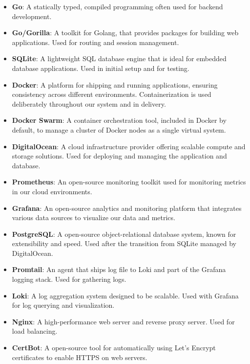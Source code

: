 \begin{multicols}{2}
    \begin{itemize}
        \item \textbf{Go}: A statically typed, compiled programming often used for backend development.
        \item \textbf{Go/Gorilla}: A toolkit for Golang, that provides packages for building web applications. Used for routing and session management.
        \item \textbf{SQLite}: A lightweight SQL database engine that is ideal for embedded database applications. Used in initial setup and for testing.
        \item \textbf{Docker}: A platform for shipping and running applications, ensuring consistency across different environments. Containerization is used deliberately throughout our system and in delivery.
        \item \textbf{Docker Swarm}: A container orchestration tool, included in Docker by default, to manage a cluster of Docker nodes as a single virtual system.
        \item \textbf{DigitalOcean}: A cloud infrastructure provider offering scalable compute and storage solutions. Used for deploying and managing the application and database.
        \item \textbf{Prometheus}: An open-source monitoring toolkit used for monitoring metrics in our cloud environments.
        \item \textbf{Grafana}: An open-source analytics and monitoring platform that integrates various data sources to visualize our data and metrics.
        \item \textbf{PostgreSQL}: A open-source object-relational database system, known for extensibility and speed. Used after the transition from SQLite managed by DigitalOcean.
        \item \textbf{Promtail}: An agent that ships log file to Loki and part of the Grafana logging stack. Used for gathering logs.
        \item \textbf{Loki}: A log aggregation system designed to be scalable. Used with Grafana for log querying and visualization.
        \item \textbf{Nginx}: A high-performance web server and reverse proxy server. Used for load balancing.
        \item \textbf{CertBot}: A open-source tool for automatically using Let's Encrypt certificates to enable HTTPS on web servers.

\end{itemize}
\end{multicols}
